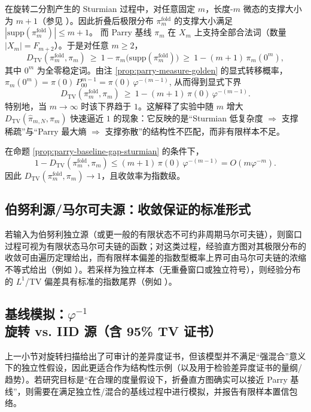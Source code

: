 \begin{proposition}\label{prop:parry-baseline-gap-sturmian}
在旋转二分割产生的 Sturmian 过程中，对任意固定 $m$，长度-$m$ 微态的支撑大小为 $m+1$（参见 \cite{MorseHedlund1940,LindMarcus1995}）。因此折叠后极限分布 $\pi_m^{\mathrm{fold}}$ 的支撑大小满足
\(
|\mathrm{supp}(\pi_m^{\mathrm{fold}})|\le m+1
\)。
而 Parry 基线 $\pi_m$ 在 $X_m$ 上支持全部合法词（数量 $|X_m|=F_{m+2}$）。于是对任意 $m\ge 2$，
\[
D_{\mathrm{TV}}(\pi_m^{\mathrm{fold}},\pi_m)\ \ge\ 1-\pi_m\bigl(\mathrm{supp}(\pi_m^{\mathrm{fold}})\bigr)
\ \ge\ 1-(m+1)\,\pi_m(0^m),
\]
其中 $0^m$ 为全零稳定词。由注 \ref{prop:parry-measure-golden} 的显式转移概率，
\(
\pi_m(0^m)=\pi(0)\,P_{00}^{m-1}=\pi(0)\,\varphi^{-(m-1)}
\),
从而得到显式下界
\[
D_{\mathrm{TV}}(\pi_m^{\mathrm{fold}},\pi_m)\ \ge\ 1-(m+1)\,\pi(0)\,\varphi^{-(m-1)}.
\]
特别地，当 $m\to\infty$ 时该下界趋于 $1$。这解释了实验中随 $m$ 增大 $D_{\mathrm{TV}}(\hat{\pi}_{m,N},\pi_m)$ 快速逼近 $1$ 的现象：它反映的是“Sturmian 低复杂度 $\Rightarrow$ 支撑稀疏”与“Parry 最大熵 $\Rightarrow$ 支撑弥散”的结构性不匹配，而非有限样本不足。
\end{proposition}

\begin{corollary}\label{cor:parry-gap-exp}
在命题 \ref{prop:parry-baseline-gap-sturmian} 的条件下，
\[
1-D_{\mathrm{TV}}(\pi_m^{\mathrm{fold}},\pi_m)
\le (m+1)\,\pi(0)\,\varphi^{-(m-1)}
=O(m\varphi^{-m}).
\]
因此 $D_{\mathrm{TV}}(\pi_m^{\mathrm{fold}},\pi_m)\to 1$，且收敛率为指数级。
\end{corollary}

\subsection{伯努利源/马尔可夫源：收敛保证的标准形式}

\begin{remark}[伯努利源的极限与有限样本界的引用口径]\label{rem:bernoulli-source-guarantee}
若输入为伯努利独立源（或更一般的有限状态不可约非周期马尔可夫链），则窗口过程可视为有限状态马尔可夫链的函数；对这类过程，经验直方图对其极限分布的收敛可由遍历定理给出，而有限样本偏差的指数型概率上界可由马尔可夫链的浓缩不等式给出（例如 \cite{Paulin2015MarkovConcentration}）。若采样为独立样本（无重叠窗口或独立符号），则经验分布的 $L^1$/TV 偏差具有标准的指数尾界（例如 \cite{WeissmanEtAl2003L1Empirical}）。
\end{remark}

\subsection{基线模拟：\texorpdfstring{$\varphi^{-1}$}{phi} 旋转 vs. IID 源（含 95\% TV 证书）}\label{subsec:exp-iid-baselines}
上一小节对旋转扫描给出了可审计的差异度证书，但该模型并不满足“强混合”意义下的独立性假设，因此更适合作为结构性示例（以及用于检验差异度证书的量纲/趋势）。若研究目标是“在合理的度量假设下，折叠直方图确实可以接近 Parry 基线”，则需要在满足独立性/混合的基线过程中进行模拟，并报告有限样本置信包络。

